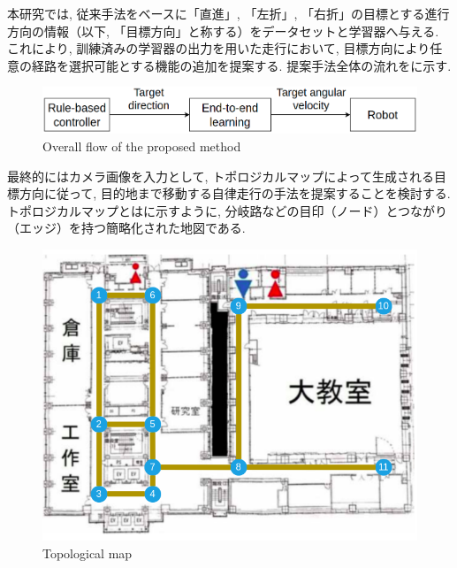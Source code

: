 \newpage

本研究では, 従来手法をベースに「直進」, 「左折」, 「右折」の目標とする進行方向の情報（以下, 「目標方向」と称する）をデータセットと学習器へ与える. これにより, 訓練済みの学習器の出力を用いた走行において, 目標方向により任意の経路を選択可能とする機能の追加を提案する. 提案手法全体の流れをに示す. 

\begin{figure}[hbtp]
     \centering
    \includegraphics[keepaspectratio, scale=0.38]
         {images/suggest_work.png}
    \caption{Overall flow of the proposed method}
    \label{Fig:suggest_work}
\end{figure}

最終的にはカメラ画像を入力として, トポロジカルマップによって生成される目標方向に従って, 目的地まで移動する自律走行の手法を提案することを検討する. トポロジカルマップとはに示すように, 分岐路などの目印（ノード）とつながり（エッジ）を持つ簡略化された地図である.

\vspace{0.5cm}

\begin{figure}[hbtp]
     \centering
    \includegraphics[keepaspectratio, scale=0.45]
         {images/tsudanuma.png}
    \caption{Topological map}
    \label{Fig:tsudanuma}
\end{figure}

